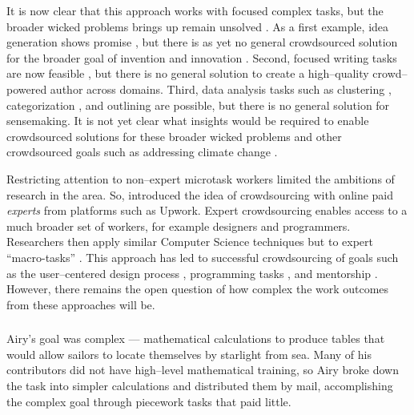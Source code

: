 \documentclass[trackingWork]{subfiles}
\begin{document}
It is now clear that this approach works with focused complex tasks, but
the broader wicked problems \citeauthor{rittel1973dilemmas} brings up remain unsolved
\cite{rittel1973dilemmas}.
As a first example,
idea generation shows promise
\cite{YuEncouragingOutside,yu2014distributed,Yu2016a},
but there is as yet no general crowdsourced solution for
the broader goal of invention and innovation
\cite{fuge2014analysis}.
Second,
focused writing tasks are now feasible
\cite{Kim2017,bernsteinSoylent,Nebeling:2016:WCW:2858036.2858169,
      writingMicroTasks,agapie2015crowdsourcing}, but
there is no general solution to create
a high--quality crowd--powered author across domains. 
Third,
data analysis tasks such as
clustering \cite{chilton2013cascade},
categorization \cite{andre2014crowd}, and
outlining \cite{luther2015crowdlines}
are possible, but there is no general solution for sensemaking.
It is not yet clear what insights would be required
to enable crowdsourced solutions for these broader wicked problems and
other crowdsourced goals such as addressing climate change
\cite{introne2011climate}.

Restricting attention to non--expert microtask workers limited
the ambitions of research in the area.
So, \citeauthor{foundry} introduced the idea of crowdsourcing with
online paid \textit{experts} from platforms such as Upwork.
Expert crowdsourcing enables access to a much broader set of workers,
for example designers and programmers.
Researchers then apply similar Computer Science techniques but
to expert ``macro-tasks''
\cite{cheng2015break,haas2015argonaut}.
This approach has led to successful crowdsourcing of goals such as
the user--centered design process \cite{foundry},
programming tasks \cite{latoza2014microtask,Fast2016,Chen2016}, and
mentorship \cite{suzukiAtelier}.
However, there remains the open question of
how complex the work outcomes from these approaches will be.


\subsubsection{\pieceworkpers}

\begin{comment}
- Farm workers-->textile
- Limit: human management and oversight
- Evaluation
- Skilled work harder
- Only some organizations can use it
- Management practices
\end{comment}

Airy's goal was complex
--- mathematical calculations to produce tables that would
allow sailors to locate themselves by starlight from sea.
Many of his contributors did not have high--level mathematical training,
so Airy broke down the task into simpler calculations and
distributed them by mail,
accomplishing the complex goal through piecework tasks that paid little.
\end{document}
